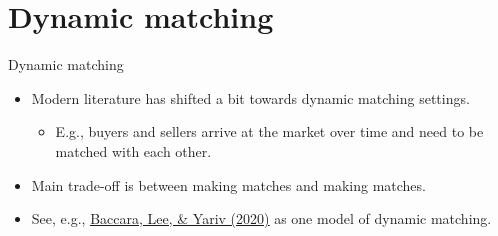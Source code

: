 \documentclass[english,10pt
,aspectratio=169
]{beamer}
\begin{document}
\section{Dynamic matching}

\begin{frame}{Dynamic matching}
	\begin{itemize}
		\item Modern literature has shifted a bit towards dynamic matching settings.
		\begin{itemize}
			\item E.g., buyers and sellers arrive at the market over time and need to be matched with each other.
		\end{itemize}
		\item Main trade-off is between making  matches and making  matches.
		\item See, e.g., \href{https://econtheory.org/ojs/index.php/te/article/view/3740}{\uline{Baccara, Lee, \& Yariv (2020)}} as one model of dynamic matching.
	\end{itemize}
\end{frame}
\end{document}
